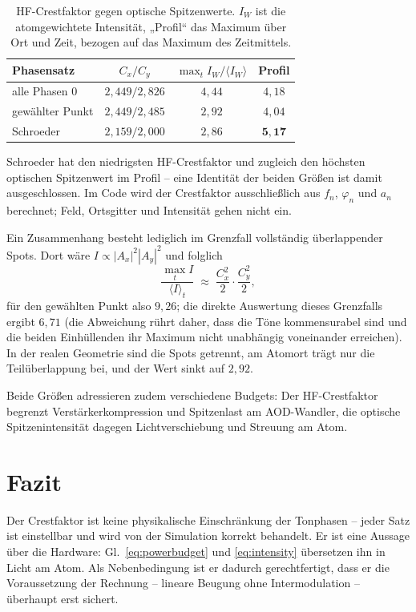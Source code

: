 \documentclass[11pt,a4paper]{article}
\newcommand{\crest}{\ensuremath{C}}
\begin{document}
\begin{table}[htb]
  \centering
  \caption{HF-Crestfaktor gegen optische Spitzenwerte. $I_W$ ist die
  atomgewichtete Intensität, „Profil`` das Maximum über Ort und Zeit,
  bezogen auf das Maximum des Zeitmittels.}
  \label{tab:abgrenzung}
  \begin{tabular}{lccc}
    \toprule
    Phasensatz & $\crest_x/\crest_y$ & $\max_t I_W/\langle I_W\rangle$ & Profil\\
    \midrule
    alle Phasen $0$ & $2{,}449/2{,}826$ & $4{,}44$ & $4{,}18$\\
    gewählter Punkt & $2{,}449/2{,}485$ & $2{,}92$ & $4{,}04$\\
    Schroeder       & $2{,}159/2{,}000$ & $2{,}86$ & $\mathbf{5{,}17}$\\
    \bottomrule
  \end{tabular}
\end{table}

Schroeder hat den niedrigsten HF-Crestfaktor und zugleich den höchsten
optischen Spitzenwert im Profil -- eine Identität der beiden Größen ist damit
ausgeschlossen. Im Code wird der Crestfaktor ausschließlich aus $f_n$,
$\varphi_n$ und $a_n$ berechnet; Feld, Ortsgitter und Intensität gehen nicht
ein.

Ein Zusammenhang besteht lediglich im Grenzfall vollständig überlappender
Spots. Dort wäre $I \propto |A_x|^2|A_y|^2$ und folglich
\begin{equation}
  \frac{\max_t I}{\langle I\rangle_t}
  \;\approx\; \frac{\crest_x^{2}}{2}\cdot\frac{\crest_y^{2}}{2},
\end{equation}
für den gewählten Punkt also $9{,}26$; die direkte Auswertung dieses
Grenzfalls ergibt $6{,}71$ (die Abweichung rührt daher, dass die Töne
kommensurabel sind und die beiden Einhüllenden ihr Maximum nicht unabhängig
voneinander erreichen). In der realen Geometrie sind die Spots getrennt, am
Atomort trägt nur die Teilüberlappung bei, und der Wert sinkt auf $2{,}92$.

Beide Größen adressieren zudem verschiedene Budgets: Der HF-Crestfaktor
begrenzt Verstärkerkompression und Spitzenlast am AOD-Wandler, die optische
Spitzenintensität dagegen Lichtverschiebung und Streuung am Atom.

\section{Fazit}

Der Crestfaktor ist keine physikalische Einschränkung der Tonphasen -- jeder
Satz ist einstellbar und wird von der Simulation korrekt behandelt. Er ist
eine Aussage über die Hardware: Gl.~\eqref{eq:powerbudget} und
\eqref{eq:intensity} übersetzen ihn in Licht am Atom. Als Nebenbedingung ist
er dadurch gerechtfertigt, dass er die Voraussetzung der Rechnung -- lineare
Beugung ohne Intermodulation -- überhaupt erst sichert.
\end{document}
